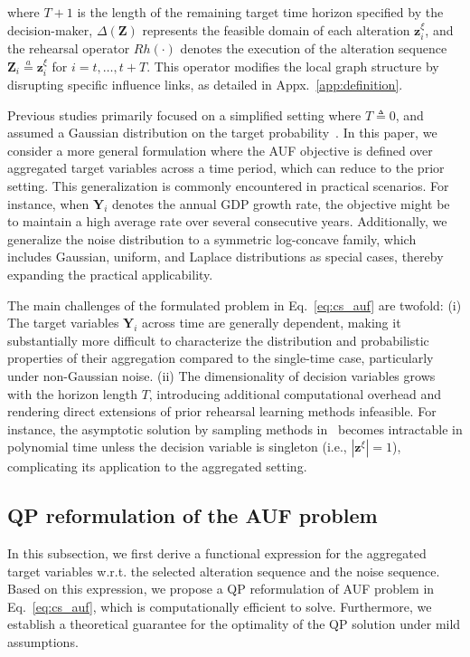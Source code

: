 \documentclass{article}
\theoremstyle{plain}
\theoremstyle{definition}
\theoremstyle{remark}
\def \Eq {Eq.}
\def \Z {\mathbf{Z}}
\def \Y {\mathbf{Y}}
\def \z {\mathbf{z}}
\newcommand{\aleq}{\mathop{=}\limits^{a}}
\begin{document}
where \(T+1\) is the length of the remaining target time horizon specified by the decision-maker, \(\Delta(\Z)\) represents the feasible domain of each alteration \(\z^\xi_i\), and the rehearsal operator \(Rh(\cdot)\) denotes the execution of the alteration sequence \(\Z_i \aleq \z^\xi_i\) for \(i = t, \dots, t+T\). 
This operator modifies the local graph structure by disrupting specific influence links, as detailed in Appx.~\ref{app:definition}.

Previous studies primarily focused on a simplified setting where \(T \triangleq 0\), and assumed a Gaussian distribution on the target probability~\citep{qint2023srm, qin2025gradient}. 
In this paper, we consider a more general formulation where the AUF objective is defined over aggregated target variables across a time period, which can reduce to the prior setting. 
This generalization is commonly encountered in practical scenarios. 
For instance, when \(\Y_i\) denotes the annual GDP growth rate, the objective might be to maintain a high average rate over several consecutive years. 
Additionally, we generalize the noise distribution to a symmetric log-concave family, which includes Gaussian, uniform, and Laplace distributions as special cases, thereby expanding the practical applicability. 


The main challenges of the formulated problem in \Eq~\eqref{eq:cs_auf} are twofold:  
(i) The target variables \(\Y_i\) across time are generally dependent, making it substantially more difficult to characterize the distribution and probabilistic properties of their aggregation compared to the single-time case, particularly under non-Gaussian noise.
(ii) The dimensionality of decision variables grows with the horizon length \(T\), introducing additional computational overhead and rendering direct extensions of prior rehearsal learning methods infeasible.  
For instance, the asymptotic solution by sampling methods in~\citet{qint2023srm} becomes intractable in polynomial time unless the decision variable is singleton (i.e., \(|\z^\xi| = 1\)), complicating its application to the aggregated setting.


\subsection{QP reformulation of the AUF problem}
\label{sec:theory}

In this subsection, we first derive a functional expression for the aggregated target variables w.r.t. the selected alteration sequence and the noise sequence. 
Based on this expression, we propose a QP reformulation of AUF problem in \Eq~\eqref{eq:cs_auf}, which is computationally efficient to solve. 
Furthermore, we establish a theoretical guarantee for the optimality of the QP solution under mild assumptions.
\end{document}
